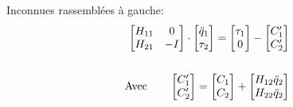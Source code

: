 \documentclass[10pt]{beamer}
\begin{document}
\begin{frame}
\begin{columns}[T]
	\begin{column}{.5\textwidth}\footnotesize
	\begin{alertblock}{Inconnues rassemblées à gauche:}
		\begin{align}
		\begin{bmatrix}
		  H_{11} & 0 \\
		  H_{21} &  -I
		\end{bmatrix} 
		\cdot
		\begin{bmatrix}
		  \ddot{q}_1 \\
		  \tau_2
		\end{bmatrix} 
		=
		\begin{bmatrix}
		  \tau_1 \\
		  0
		\end{bmatrix} 
		-
		\begin{bmatrix}
		  C'_{1} \\
		  C'_{2}
		\end{bmatrix} \label{equ_equationMvt_dynHyb2} \\
		\notag \\
		\textnormal{Avec} \qquad
		\begin{bmatrix}
		  C'_{1} \\
		  C'_{2}
		\end{bmatrix}
		=
		\begin{bmatrix}
		  C_{1} \\
		  C_{2}
		\end{bmatrix}
		+
		\begin{bmatrix}
		  H_{12} \ddot{q}_2 \\
		  H_{22} \ddot{q}_2
		\end{bmatrix} \label{equ_cPrime}
		\end{align}
	\end{alertblock}
	\end{column}
	\end{columns}

\end{frame}
\end{document}
